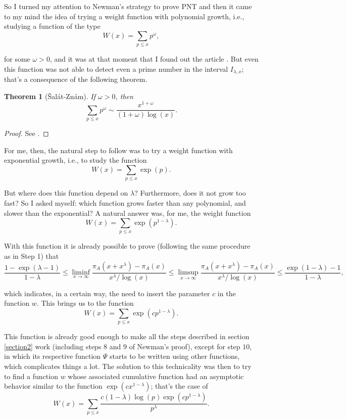 \documentclass[11pt]{amsart}
\newtheorem{theorem}{Theorem}[section]
\numberwithin{equation}{section}
\newcommand{\disum}{\displaystyle \sum}
\newcommand{\difrac}{\displaystyle \frac}
\newcommand{\diliminf}{\displaystyle \liminf}
\newcommand{\dilimsup}{\displaystyle \limsup}
\begin{document}
So I turned my attention to Newman’s strategy to prove PNT and then it came to my mind the idea of trying a weight function with polynomial growth, i.e., studying a function of the type $$W(x) = \disum_{p \leq x} p^\omega,$$

\noindent for some $\omega > 0$, and it was at that moment that I found out the article \cite{SZ}. But even this function was not able to detect even a prime number in the interval $I_{\lambda, x}$; that's a consequence of the following theorem.

\begin{theorem} [\v{S}al\'at-Zn\'am]

If $\omega > 0$, then $$\disum_{p \leq x} p^\omega \sim \difrac{x^{1 + \omega}}{(1 + \omega)\log(x)}.$$

\end{theorem}

\begin{proof} See \cite{SZ}. \end{proof}

For me, then, the natural step to follow was to try a weight function with exponential growth, i.e., to study the function $$W(x) = \disum_{p \leq x} \exp(p).$$

But where does this function depend on $\lambda$? Furthermore, does it not grow too fast? So I asked myself: which function grows faster than any polynomial, and slower than the exponential? A natural answer was, for me, the weight function $$W(x) = \disum_{p \leq x} \exp(p^{1 - \lambda}).$$

With this function it is already possible to prove (following the same procedure as in Step 1) that $$\difrac{1-\exp(\lambda - 1)}{1 - \lambda} \leq \diliminf_{x \to \infty} \difrac{\pi_A(x + x^\lambda) - \pi_A(x)}{x^\lambda/\log(x)} \leq \dilimsup_{x \to \infty} \difrac{\pi_A(x + x^\lambda) - \pi_A(x)}{x^\lambda/\log(x)} \leq \difrac{\exp(1 - \lambda) - 1}{1 - \lambda},$$

\noindent which indicates, in a certain way, the need to insert the parameter $c$ in the function $w$. This brings us to the function $$W(x) = \disum_{p \leq x} \exp(cp^{1 - \lambda}).$$

This function is already good enough to make all the steps described in section \ref{section2} work (including steps $8$ and $9$ of Newman's proof), except for step $10$, in which its respective function $\Psi$ starts to be written using other functions, which complicates things a lot. The solution to this technicality was then to try to find a function $w$ whose associated cumulative function had an asymptotic behavior similar to the function $\exp(cx^{1 - \lambda})$; that’s the case of $$W(x) = \disum_{p \leq x} \difrac{c(1 - \lambda) \log(p) \exp(cp^{1 - \lambda})}{p^{\lambda}}.$$
\end{document}
